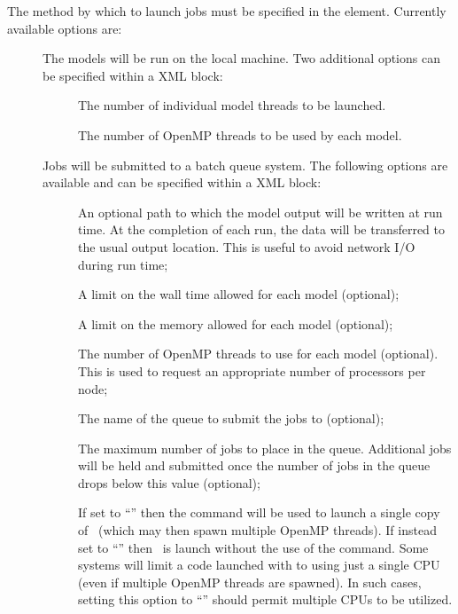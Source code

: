 The method by which to launch jobs must be specified in the  element. Currently available options are:
\begin{description}
\item[] The models will be run on the local machine. Two additional options can be specified within a  XML block:
\begin{description}
\item[] The number of individual model threads to be launched.
\item[] The number of OpenMP threads to be used by each model.
\end{description}

\item[] Jobs will be submitted to a  batch queue system. The following options are available and can be specified within a  XML block:
\begin{description}
\item[] An optional path to which the model output will be written at run time. At the completion of each run, the data will be transferred to the usual output location. This is useful to avoid network I/O during run time;
\item[] A limit on the wall time allowed for each model (optional);
\item[] A limit on the memory allowed for each model (optional);
\item[] The number of OpenMP threads to use for each model (optional). This is used to request an appropriate number of processors per node;
\item[] The name of the queue to submit the jobs to (optional);
\item[] The maximum number of jobs to place in the queue. Additional jobs will be held and submitted once the number of jobs in the queue drops below this value (optional);
\item[] If set to ``'' then the  command will be used to launch a single copy of \glc\ (which may then spawn multiple OpenMP threads). If instead set to ``'' then \glc\ is launch without the use of the  command. Some systems will limit a code launched with  to using just a single CPU (even if multiple OpenMP threads are spawned). In such cases, setting this option to ``'' should permit multiple CPUs to be utilized.

\end{description}
\end{description}

